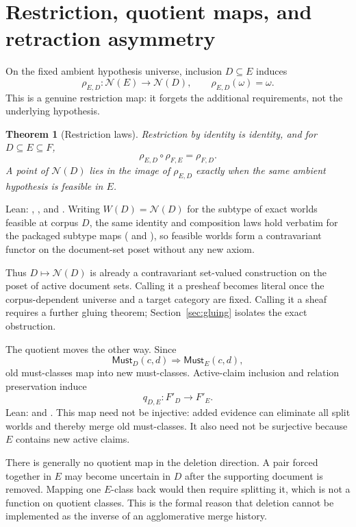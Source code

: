 \documentclass[11pt]{article}
\newtheorem{theorem}{Theorem}[section]
\theoremstyle{definition}
\theoremstyle{remark}
\newcommand{\Feas}{\mathcal N}
\newcommand{\Must}{\mathsf{Must}}
\begin{document}
\section{Restriction, quotient maps, and retraction asymmetry}
\label{sec:restriction}

On the fixed ambient hypothesis universe, inclusion $D\subseteq E$ induces
\[
  \rho_{E,D}:\Feas(E)\longrightarrow\Feas(D),\qquad
  \rho_{E,D}(\omega)=\omega.
\]
This is a genuine restriction map: it forgets the additional requirements, not
the underlying hypothesis.

\begin{theorem}[Restriction laws]
Restriction by identity is identity, and for $D\subseteq E\subseteq F$,
\[
  \rho_{E,D}\circ\rho_{F,E}=\rho_{F,D}.
\]
A point of $\Feas(D)$ lies in the image of $\rho_{E,D}$ exactly when the same
ambient hypothesis is feasible in $E$.
\end{theorem}
\noindent Lean: ,
, and
.  Writing $W(D)=\Feas(D)$ for the
subtype of exact worlds feasible at corpus $D$, the same identity and
composition laws hold verbatim for the packaged subtype maps
( and ), so feasible worlds
form a contravariant functor on the document-set poset without any new axiom.

Thus $D\mapsto\Feas(D)$ is already a contravariant set-valued construction on
the poset of active document sets.  Calling it a presheaf becomes literal once
the corpus-dependent universe and a target category are fixed.  Calling it a
sheaf requires a further gluing theorem; Section~\ref{sec:gluing} isolates the
exact obstruction.

The quotient moves the other way.  Since
\[
  \Must_D(c,d)\Longrightarrow\Must_E(c,d),
\]
old must-classes map into new must-classes.  Active-claim inclusion and
relation preservation induce
\[
  q_{D,E}:F'_D\longrightarrow F'_E.
\]
Lean:  and .
This map need not be injective: added evidence can eliminate all split worlds
and thereby merge old must-classes.  It also need not be surjective because
$E$ contains new active claims.

There is generally no quotient map in the deletion direction.  A pair forced
together in $E$ may become uncertain in $D$ after the supporting document is
removed.  Mapping one $E$-class back would then require splitting it, which is
not a function on quotient classes.  This is the formal reason that deletion
cannot be implemented as the inverse of an agglomerative merge history.
\end{document}
